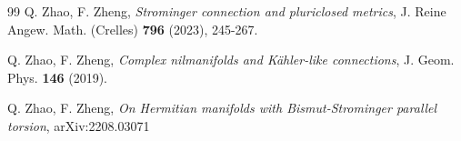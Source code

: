 \documentclass{amsart}
\numberwithin{equation}{section}
\theoremstyle{definition}
\renewcommand{\1}{\mathds{1}}
\renewcommand{\>}{\rightarrow}
\begin{document}
\begin{thebibliography}{99}
 Q. Zhao, F. Zheng,
\newblock \textit{Strominger connection and pluriclosed metrics},
\newblock J. Reine Angew. Math. (Crelles) { \bf 796} (2023), 245-267.

 Q. Zhao, F. Zheng,
\newblock \textit{Complex nilmanifolds and K\"ahler-like connections},
\newblock J. Geom. Phys. {\bf 146} (2019).

 Q. Zhao, F. Zheng,
\newblock \textit{On Hermitian manifolds with Bismut-Strominger parallel torsion},
\newblock arXiv:2208.03071







\end{thebibliography}
\end{document}
